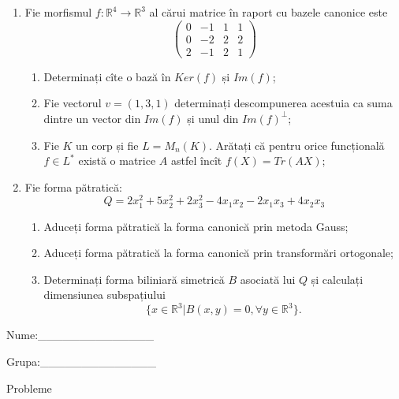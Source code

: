 \documentclass{article}
\begin{document}
\begin{enumerate}
 \item Fie morfismul $f:\mathbb{R}^4 \to \mathbb{R}^3$ al cărui matrice în raport cu bazele canonice este
$$\begin{pmatrix}
0&-1&1&1\\
0&-2&2&2\\
2&-1&2&1
\end{pmatrix}$$

\begin{enumerate}
\item Determinați cîte o bază în $Ker(f)$ și $Im(f)$;
\item Fie vectorul $v=(1,3,1)$ determinați descompunerea acestuia ca suma dintre un vector din $Im(f)$ și unul din $Im(f)^\perp$;
\item Fie $K$ un corp și fie $L=M_n(K)$. Arătați că pentru orice funcțională $f \in L^*$ există o matrice $A$ astfel încît $f(X)=Tr(AX)$;
\end{enumerate}
\item Fie forma pătratică:
$$Q= 2x_1^2+5x_2^2+2x_3^2-4x_1x_2-2x_1x_3+4x_2x_3$$

\begin{enumerate}
\item Aduceți forma pătratică la forma canonică prin metoda Gauss;
\item Aduceți forma pătratică la forma canonică prin transformări ortogonale;
\item Determinați forma biliniară simetrică $B$ asociată lui $Q$ și calculați dimensiunea subspațiului
$$\{x \in \mathbb{R}^3 | B(x,y)=0,\forall y \in \mathbb{R}^3\}.$$

\end{enumerate}
\end{enumerate}
\newpage
\begin{flushright}
Nume:\_\_\_\_\_\_\_\_\_\_\_\_\_\_
 
 
Grupa:\_\_\_\_\_\_\_\_\_\_\_\_\_\_
\end{flushright}
\begin{center}
\vspace{2cm}
{\Large Probleme}
\vspace{2cm}
\end{center}
\end{document}

